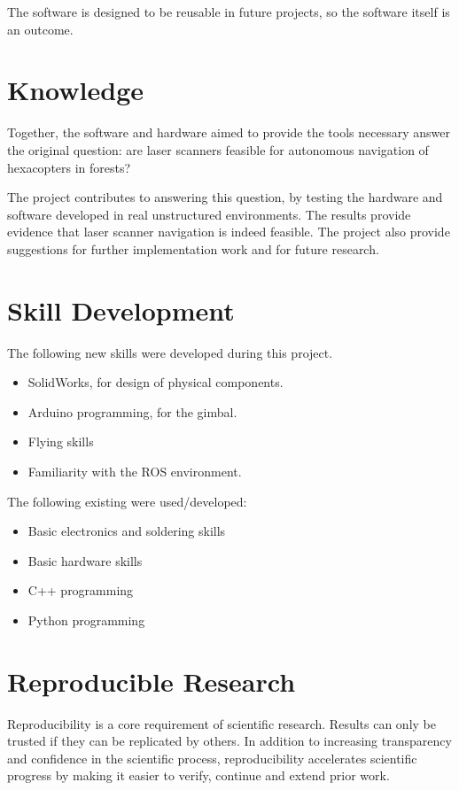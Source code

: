 \documentclass[12pt,oneside,a4paper,draft]{book}
\begin{document}
The software is designed to be reusable in future projects, so the
software itself is an outcome.

\section{Knowledge}
\label{sec:knowledge}

Together, the software and hardware aimed to provide the tools
necessary answer the original question: are laser scanners feasible
for autonomous navigation of hexacopters in forests?

The project contributes to answering this question, by testing the
hardware and software developed in real unstructured environments. The
results provide evidence that laser scanner navigation is indeed
feasible. The project also provide suggestions for further
implementation work and for future research.

\section{Skill Development}
\label{sec:skill-development}

The following new skills were developed during this project.

\begin{itemize}
\item SolidWorks, for design of physical components.
\item Arduino programming, for the gimbal.
\item Flying skills
\item Familiarity with the \gls{ROS} environment.
 \end{itemize}
 
The following existing were used/developed:
\begin{itemize}
\item Basic electronics and soldering skills
\item Basic hardware skills
\item C++ programming
\item Python programming
\end{itemize}

\section{Reproducible Research}
\label{sec:repr-rese}

Reproducibility is a core requirement of scientific research. Results
can only be trusted if they can be replicated by others. In addition
to increasing transparency and confidence in the scientific process,
reproducibility accelerates scientific progress by making it easier to
verify, continue and extend prior work.
\end{document}
